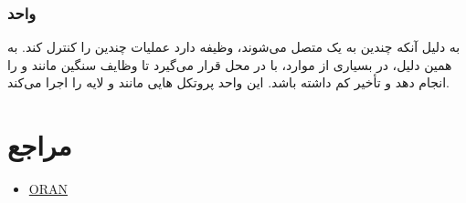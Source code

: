 \documentclass[landscape, 12pt]{report}
\begin{document}
\subsubsection*{واحد 
	}
به دلیل آنکه چندین
  به یک
    متصل می‌شوند،
      وظیفه دارد عملیات چندین
        را کنترل ‌کند. به همین دلیل، در بسیاری از موارد،
          با
            در محل قرار می‌گیرد تا وظایف سنگین مانند
              و
                را انجام دهد و تأخیر کم داشته باشد. این واحد پروتکل هایی مانند
                  و لایه
                    را اجرا می‌کند.

\section* {مراجع}
\begin{itemize}
	\item 
	\href{https://www.youtube.com/watch?v=Z9kJ8HT\_IVM} {ORAN}
	
\end{itemize}
\end{document}
